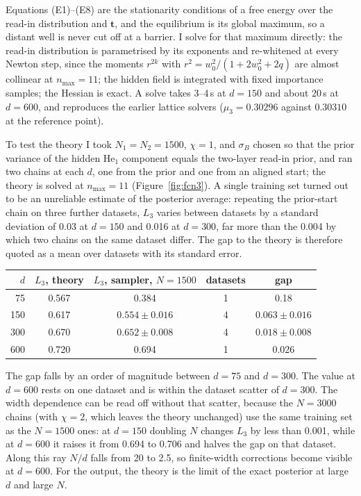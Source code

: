 \documentclass[11pt,a4paper]{article}
\begin{document}
Equations (E1)--(E8) are the stationarity conditions of a free energy over the read-in distribution and $\mathbf t$, and
the equilibrium is its global maximum, so a distant well is never cut off at a barrier. I solve for that maximum
directly: the read-in distribution is parametrised by its exponents and re-whitened at every Newton step, since the
moments $r^{2k}$ with $r^2=w_0^2/(1+2w_0^2+2q)$ are almost collinear at $n_{\max}=11$; the hidden field is integrated
with fixed importance samples; the Hessian is exact. A solve takes 3--4\,s at $d=150$ and about 20\,s at $d=600$, and
reproduces the earlier lattice solvers ($\mu_3=0.30296$ against $0.30310$ at the reference point).


To test the theory I took $N_1=N_2=1500$, $\chi=1$, and $\sigma_B$ chosen so that the prior variance of the
hidden He$_1$ component equals the two-layer read-in prior, and ran two chains at each $d$, one from the prior and one
from an aligned start; the theory is solved at $n_{\max}=11$ (Figure~\ref{fig:fcn3}). A single training set turned out
to be an unreliable estimate of the posterior average: repeating the prior-start chain on three further datasets, $L_3$
varies between datasets by a standard deviation of 0.03 at $d=150$ and 0.016 at $d=300$, far more than the 0.004 by which
two chains on the same dataset differ. The gap to the theory is therefore quoted as a mean over datasets with its
standard error.
\begin{center}
\begin{tabular}{@{}rcccc@{}}
\toprule
$d$ & $L_3$, theory & $L_3$, sampler, $N=1500$ & datasets & gap\\
\midrule
75  & 0.567 & 0.384 & 1 & 0.18\\
150 & 0.617 & $0.554\pm0.016$ & 4 & $0.063\pm0.016$\\
300 & 0.670 & $0.652\pm0.008$ & 4 & $0.018\pm0.008$\\
600 & 0.720 & 0.694 & 1 & 0.026\\
\bottomrule
\end{tabular}
\end{center}
The gap falls by an order of magnitude between $d=75$ and $d=300$. The value at $d=600$ rests on one dataset and is
within the dataset scatter of $d=300$. The width dependence can be read off without that scatter, because the $N=3000$
chains (with $\chi=2$, which leaves the theory unchanged) use the same training set as the $N=1500$ ones: at $d=150$
doubling $N$ changes $L_3$ by less than 0.001, while at $d=600$ it raises it from 0.694 to 0.706 and halves the gap on that
dataset. Along this ray $N/d$ falls from 20 to 2.5, so finite-width corrections become visible at $d=600$. For the
output, the theory is the limit of the exact posterior at large $d$ and large $N$.
\end{document}
